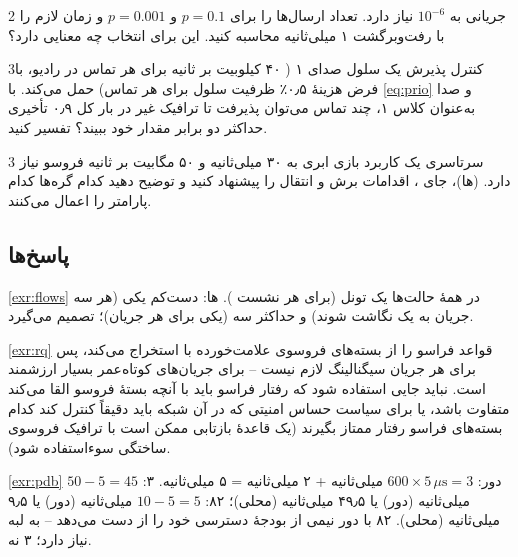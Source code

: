 \documentclass[11pt,a4paper]{article}
\begin{document}
\begin{exercisebox}{2}{}\label{exr:harq}
جریانی به  $10^{-6}$ نیاز دارد. تعداد ارسال‌ها را برای $p = 0.1$ و $p = 0.001$ و زمان لازم را با رفت‌وبرگشت  ۱ میلی‌ثانیه
محاسبه کنید. این برای انتخاب  چه معنایی دارد؟
\end{exercisebox}

\begin{exercisebox}{3}{کنترل پذیرش}\label{exr:adm}
یک سلول صدای  ۱ ( ۴۰ کیلوبیت بر ثانیه برای هر تماس در رادیو، با فرض هزینهٔ ۰٫۵٪ ظرفیت سلول برای هر تماس) حمل می‌کند. با
\cref{eq:prio} و صدا به‌عنوان کلاس ۱، چند تماس می‌توان پذیرفت تا ترافیک غیر در بار کل ۰٫۹ تأخیری حداکثر دو برابر مقدار  خود
ببیند؟ تفسیر کنید.
\end{exercisebox}

\begin{exercisebox}{3}{ سرتاسری}\label{exr:e2e}
یک کاربرد بازی ابری به  ۳۰ میلی‌ثانیه و ۵۰ مگابیت بر ثانیه فروسو نیاز دارد. (ها)، جای ، اقدامات برش و انتقال را پیشنهاد
کنید و توضیح دهید کدام گره‌ها کدام پارامتر را اعمال می‌کنند.
\end{exercisebox}

\subsection*{پاسخ‌ها}

\begin{solutionbox}{\ref{exr:flows}}
در همهٔ حالت‌ها یک تونل  (برای هر نشست ). ها: دست‌کم یکی (هر سه جریان به یک  نگاشت شوند) و حداکثر سه (یکی برای
هر جریان)؛  تصمیم می‌گیرد.
\end{solutionbox}

\begin{solutionbox}{\ref{exr:rq}}
 قواعد فراسو را از بسته‌های فروسوی علامت‌خورده با  استخراج می‌کند، پس برای هر جریان سیگنالینگ  لازم نیست -- برای
جریان‌های کوتاه‌عمر بسیار ارزشمند است. نباید جایی استفاده شود که رفتار فراسو باید با آنچه بستهٔ فروسو القا می‌کند متفاوت باشد، یا برای سیاست
حساس امنیتی که در آن شبکه باید دقیقاً کنترل کند کدام بسته‌های فراسو رفتار ممتاز بگیرند (یک قاعدهٔ بازتابی ممکن است با ترافیک فروسوی ساختگی
سوءاستفاده شود).
\end{solutionbox}

\begin{solutionbox}{\ref{exr:pdb}}
 دور: $600\times5\,\mu\mathrm{s} = 3$ میلی‌ثانیه + ۲ میلی‌ثانیه = ۵ میلی‌ثانیه.  ۳: $50 - 5 = 45$ میلی‌ثانیه (دور) یا ۴۹٫۵
میلی‌ثانیه (محلی)؛  ۸۲: $10 - 5 = 5$ میلی‌ثانیه (دور) یا ۹٫۵ میلی‌ثانیه (محلی).  ۸۲ با  دور نیمی از بودجهٔ دسترسی خود را
از دست می‌دهد -- به  لبه نیاز دارد؛  ۳ نه.
\end{solutionbox}
\end{document}
